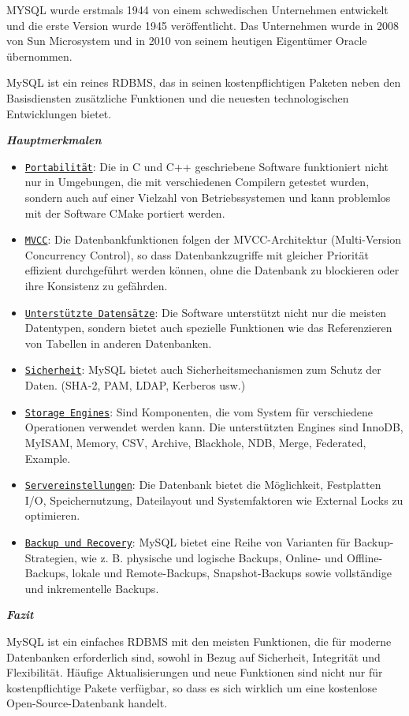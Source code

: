 MYSQL wurde erstmals 1944 von einem schwedischen Unternehmen entwickelt und die erste Version
wurde 1945 veröffentlicht. Das Unternehmen wurde in 2008 von Sun Microsystem und in 2010 von seinem
heutigen Eigentümer Oracle übernommen.\cite{MySQL_Wiki} 

MySQL ist ein reines RDBMS, das in seinen kostenpflichtigen Paketen neben den Basisdiensten 
zusätzliche Funktionen und die neuesten technologischen Entwicklungen bietet. 

\begin{large} \emph{\textbf{Hauptmerkmalen}} \end{large}
\begin{itemize}
    \item \underline{\texttt{Portabilität}}:
        Die in C und C++ geschriebene Software funktioniert nicht nur in Umgebungen,
        die mit verschiedenen Compilern getestet wurden, sondern auch auf einer Vielzahl 
        von Betriebssystemen und kann problemlos mit der Software CMake portiert werden.\cite{MySQL_Features} 
    \item \underline{\texttt{MVCC}}:
        Die Datenbankfunktionen folgen der MVCC-Architektur (Multi-Version Concurrency Control),
        so dass Datenbankzugriffe mit gleicher Priorität effizient durchgeführt werden können, 
        ohne die Datenbank zu blockieren oder ihre Konsistenz zu gefährden.\cite{MVCC_Wiki} 
    \item \underline{\texttt{Unterstützte Datensätze}}:
        Die Software unterstützt nicht nur die meisten Datentypen, sondern bietet auch spezielle 
        Funktionen wie das Referenzieren von Tabellen in anderen Datenbanken.\cite{MySQL_Features}
    \item \underline{\texttt{Sicherheit}}:
        MySQL bietet auch Sicherheitsmechanismen zum Schutz der Daten. 
        (SHA-2, PAM, LDAP, Kerberos usw.)\cite{MySQL_Authentication} 
    \item \underline{\texttt{Storage Engines}}:
        Sind Komponenten, die vom System für verschiedene Operationen verwendet werden kann.
        Die unterstützten Engines sind InnoDB, MyISAM, Memory, CSV, Archive, Blackhole, NDB,
        Merge, Federated, Example. 
    \item \underline{\texttt{Servereinstellungen}}:
        Die Datenbank bietet die Möglichkeit, Festplatten I/O, Speichernutzung, Dateilayout und 
        Systemfaktoren wie External Locks zu optimieren. 
    \item \underline{\texttt{Backup und Recovery}}:
        MySQL bietet eine Reihe von Varianten für Backup-Strategien, wie z. B. physische und logische
        Backups, Online- und Offline-Backups, lokale und Remote-Backups, Snapshot-Backups sowie
        vollständige und inkrementelle Backups.\cite{MySQL_Backup}
\end{itemize} 
\begin{large} \emph{\textbf{Fazit}} \end{large}
MySQL ist ein einfaches RDBMS mit den meisten Funktionen, die für moderne Datenbanken erforderlich 
sind, sowohl in Bezug auf Sicherheit, Integrität und Flexibilität. Häufige Aktualisierungen und neue
Funktionen sind nicht nur für kostenpflichtige Pakete verfügbar, so dass es sich wirklich um eine
kostenlose Open-Source-Datenbank handelt. 